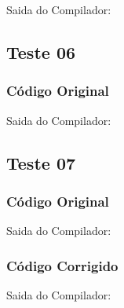 Saida do Compilador:




\subsection{Teste 06}
\label{subsec:semanticoTeste06}

\subsubsection{Código Original}


Saida do Compilador:




\subsection{Teste 07}
\label{subsec:semanticoTeste07}

\subsubsection{Código Original}


Saida do Compilador:




\subsubsection{Código Corrigido}


Saida do Compilador:


